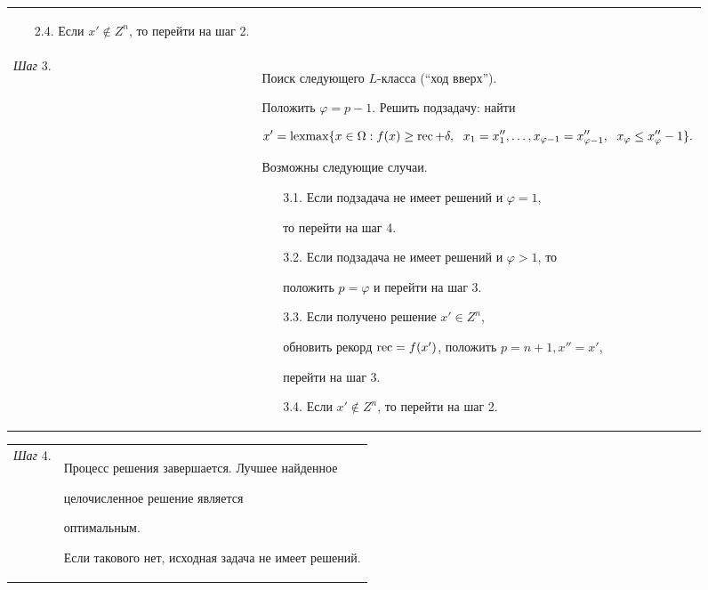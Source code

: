 \begin{tabular}{p{14mm}p{145mm}}
\begin{itemize}
перейти на шаг 3.


\item[2.4.] Если $x' \not \in Z^{n}$, то перейти на шаг 2.


\end{itemize}


\\





{\it Шаг} 3. & Поиск следующего $L$-класса (``ход вверх'').


Положить $\varphi = p-1$. Решить подзадачу: найти


$$


x'= \lexmax \{x \in \Omega :  f(x) \geq \rec + \delta, 


\ \; x_1=x''_1, \dotsc ,x_{\varphi-1} =x''_{\varphi-1},\ \; x_\varphi \leq


x''_\varphi  - 1\}.


$$





\noindent{}Возможны следующие случаи.


\begin{itemize}


\item[3.1.] Если подзадача не имеет решений и $\varphi=1$,


то перейти на шаг 4.


\item[3.2.] Если подзадача не имеет решений и $\varphi>1$, то


положить $p = \varphi$ и перейти на шаг 3.


\item[3.3.] Если получено решение $x' \in  Z^n$,


обновить рекорд $\operatorname{rec} = f(x')$, положить $p = n+1,x''= x'$,


перейти на шаг 3.


\item[3.4.] Если $x' \notin Z^{n}$, то перейти на шаг 2.


\end{itemize}


\end{tabular}





\begin{tabular}{p{14mm}p{145mm}}


{\it Шаг} 4. & Процесс решения завершается. Лучшее найденное


целочисленное решение является


оптимальным.


Если такового нет, исходная задача не имеет решений.


\end{tabular}


